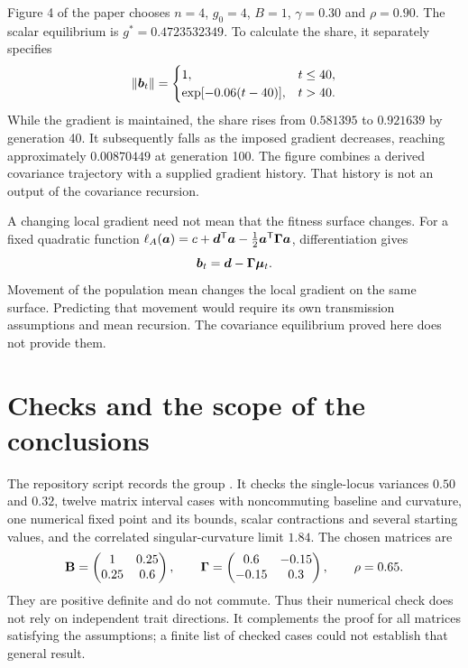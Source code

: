 Figure 4 of the paper chooses $n=4$, $g_0=4$, $B=1$,
$\gamma=0.30$ and $\rho=0.90$. The scalar equilibrium is
$g^*=0.4723532349$. To calculate the share, it separately specifies
\begin{equation}
  \left\lVert \boldsymbol{b}_t\right\rVert=
  \begin{cases}
    1,&t\leq40,\\
    \exp[-0.06(t-40)],&t>40.
  \end{cases}
  \label{inheritance:figure-gradient-history}
\end{equation}
While the gradient is maintained, the share rises from $0.581395$ to
$0.921639$ by generation 40. It subsequently falls as the imposed
gradient decreases, reaching approximately $0.00870449$ at generation
100. The figure combines a derived covariance trajectory with a supplied
gradient history. That history is not an output of the covariance recursion.

A changing local gradient need not mean that the fitness surface changes.
For a fixed quadratic function
$\ell_A(\boldsymbol{a})=c+\boldsymbol{d}^{\mathsf T}\boldsymbol{a}
-\tfrac12\boldsymbol{a}^{\mathsf T}\boldsymbol{\Gamma}\boldsymbol{a}$, differentiation gives
\begin{equation}
  \boldsymbol{b}_t=\boldsymbol{d}-\boldsymbol{\Gamma}\boldsymbol{\mu}_t.
  \label{inheritance:gradient-at-mean}
\end{equation}
Movement of the population mean changes the local gradient on the same
surface. Predicting that movement would require its own transmission
assumptions and mean recursion. The covariance equilibrium proved here
does not provide them.

\section{Checks and the scope of the conclusions}
\label{inheritance:checks}

The repository script
 records the group
. It checks the
single-locus variances $0.50$ and $0.32$, twelve matrix interval cases with
noncommuting baseline and curvature, one numerical fixed point and its
bounds, scalar contractions and several starting values, and the correlated
singular-curvature limit $1.84$. The chosen matrices are
\begin{equation}
  \mathbf{B}=\begin{pmatrix}1&0.25\\0.25&0.6\end{pmatrix},
  \qquad
  \boldsymbol{\Gamma}=\begin{pmatrix}0.6&-0.15\\-0.15&0.3\end{pmatrix},
  \qquad \rho=0.65.
\end{equation}
They are positive definite and do not commute. Thus their numerical check
does not rely on independent trait directions. It complements the proof
for all matrices satisfying the assumptions; a finite list of checked
cases could not establish that general result.

